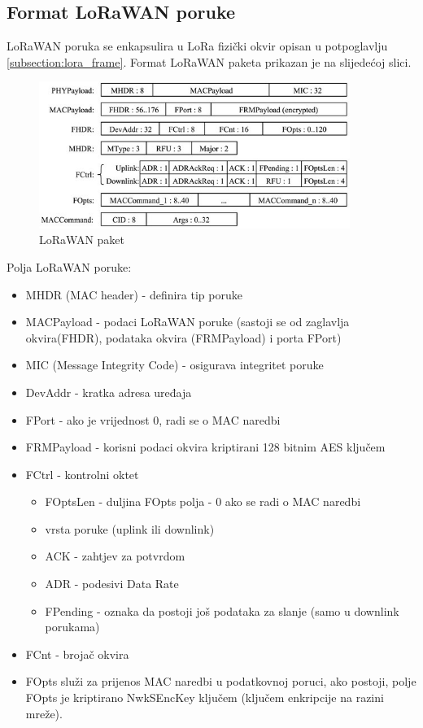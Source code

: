 \subsection{Format LoRaWAN poruke}
\label{subsection:lorawan_packet}
LoRaWAN poruka se enkapsulira u LoRa fizički okvir opisan u potpoglavlju \ref{subsection:lora_frame}. Format LoRaWAN paketa prikazan je na slijedećoj slici.
\begin{figure}[ht!]
	\centering
	\includegraphics[width=0.9\textwidth]{images/packet.jpg}
	\caption{LoRaWAN paket}
	\label{img:lorawan_packet}
\end{figure}

\newpage
Polja LoRaWAN poruke:
\begin{itemize}
\item MHDR (MAC header) - definira tip poruke
\item MACPayload - podaci LoRaWAN poruke (sastoji se od zaglavlja okvira(FHDR), podataka okvira (FRMPayload) i porta FPort)
\item MIC (Message Integrity Code) - osigurava integritet poruke
\item DevAddr - kratka adresa uređaja
\item FPort - ako je vrijednost 0, radi se o MAC naredbi
\item FRMPayload - korisni podaci okvira kriptirani 128 bitnim AES ključem
\item FCtrl - kontrolni oktet
\begin{itemize}
\item FOptsLen - duljina FOpts polja - 0 ako se radi o MAC naredbi
\item vrsta poruke (uplink ili downlink)
\item ACK - zahtjev za potvrdom
\item ADR - podesivi Data Rate
\item FPending - oznaka da postoji još podataka za slanje (samo u downlink porukama)
\end{itemize} 
\item FCnt - brojač okvira
\item FOpts služi za prijenos MAC naredbi  u podatkovnoj poruci, ako postoji, polje FOpts je kriptirano NwkSEncKey ključem (ključem enkripcije na razini mreže).
\end{itemize}


